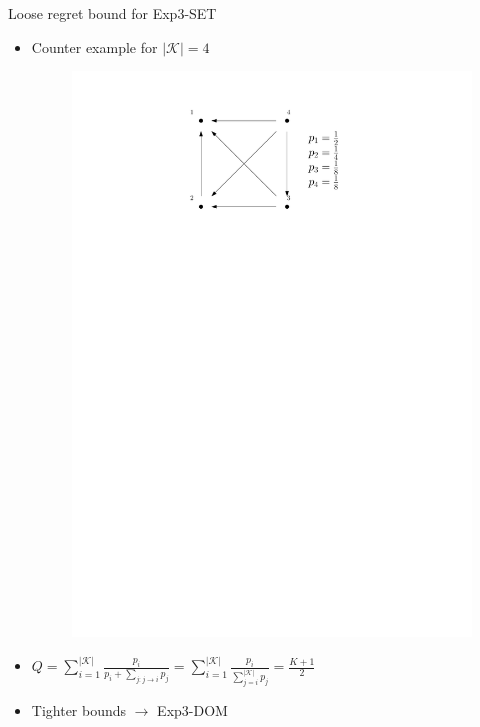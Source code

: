 \documentclass{beamer}
\begin{document}
\begin{frame}{Loose regret bound for Exp3-SET}
  \begin{itemize}
   \item Counter example for $|\mathcal{K}|=4$

   \begin{figure}
    \centering
    \includegraphics[scale=0.7]{dag}
   \end{figure}


   \item $Q=\sum_{i=1}^{|\mathcal{K}|}\frac{p_i}{p_i+\sum_{j:j\to i}p_j}=\sum_{i=1}^{|\mathcal{K}|}\frac{p_i}{\sum_{j=i}^{|\mathcal{K}|}p_j}=\frac{K+1}{2}$

   \item Tighter bounds $\to$ Exp3-DOM
  \end{itemize}
\end{frame}
\end{document}
